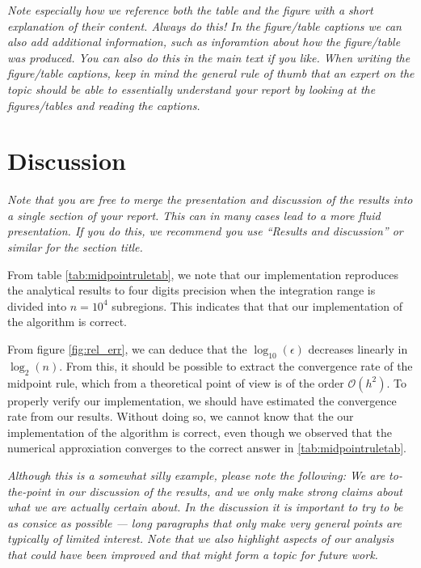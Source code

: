 \documentclass[english,notitlepage,reprint,nofootinbib]{revtex4-1}  %
\begin{document}
\textit{Note especially how we reference both the table and the figure with a short explanation of their content. Always do this! In the figure/table captions we can also add additional information, such as inforamtion about how the figure/table was produced. You can also do this in the main text if you like. When writing the figure/table captions, keep in mind the general rule of thumb that an expert on the topic should be able to essentially understand your report by looking at the figures/tables and reading the captions.}


\section{Discussion}\label{sec:discussion}
%
\textit{Note that you are free to merge the presentation and discussion of the results into a single section of your report. This can in many cases lead to a more fluid presentation. If you do this, we recommend you use ``Results and discussion'' or similar for the section title.}

From table \ref{tab:midpointruletab}, we note that our implementation reproduces the analytical results to four digits precision when the integration range is divided into $n = 10^4$ subregions. This indicates that that our implementation of the algorithm is correct.

From figure \ref{fig:rel_err}, we can deduce that the $\log_{10}(\epsilon)$ decreases linearly in $\log_{2}(n)$. From this, it should be possible to extract the convergence rate of the midpoint rule, which from a theoretical point of view is of the order $\mathcal{O}(h^2)$. To properly verify our implementation, we should have estimated the convergence rate from our results. Without doing so, we cannot know that the our implementation of the algorithm is correct, even though we observed that the numerical approxiation converges to the correct answer in \ref{tab:midpointruletab}.

\textit{Although this is a somewhat silly example, please note the following: We are to-the-point in our discussion of the results, and we only make strong claims about what we are actually certain about. In the discussion it is important to try to be as consice as possible --- long paragraphs that only make very general points are typically of limited interest. Note that we also highlight aspects of our analysis that could have been improved and that might form a topic for future work.}
\end{document}
